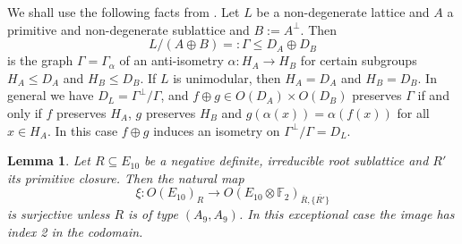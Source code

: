 \documentclass[a4paper]{amsart}
\theoremstyle{definition}
\theoremstyle{plain}
\newtheorem{lemma}[definition]{Lemma}
\newcommand{\FF}{\mathbb{F}}
\begin{document}
We shall use the following facts from \cite{nikulin}.
Let $L$ be a non-degenerate lattice and $A$ a primitive and non-degenerate sublattice and $B:=A^\perp$.
Then \[L/(A\oplus B)=:\Gamma \leq D_A \oplus D_B\] 
is the graph $\Gamma=\Gamma_\alpha$ of an anti-isometry $\alpha \colon H_A \to H_B$ for certain subgroups $H_A \leq D_A$ and $H_B \leq D_B$. If $L$ is unimodular, then $H_A=D_A$ and $H_B=D_B$. In general we have $D_L = \Gamma^\perp / \Gamma$, and $f\oplus g \in O(D_A)\times O(D_B)$ preserves $\Gamma$ if and only if $f$ preserves $H_A$, $g$ preserves $H_B$ and $g(\alpha(x)) = \alpha(f(x))$ for all $x \in H_A$. In this case $f \oplus g$ induces an isometry on $\Gamma^\perp/\Gamma = D_L$.

\begin{lemma}\label{lem:GY-transitive_on_ADE}
Let $R \subseteq E_{10}$ be a negative definite, irreducible root sublattice and $R'$ its primitive closure.
Then the natural map 
\[\xi\colon O(E_{10})_R \to O(E_{10}\otimes \FF_2)_{\overline{R},\{\overline{R'}\}}\] 
is surjective
unless $R$ is of type $(A_9,A_9)$. In this exceptional case the image has index 2 in the codomain.
\end{lemma}
\end{document}
